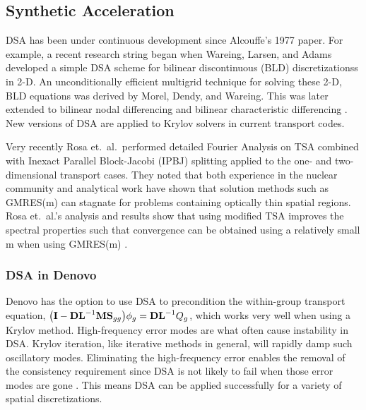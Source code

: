 \subsection{Synthetic Acceleration}
DSA has been under continuous development since Alcouffe's 1977 paper. For example, a recent research string began when Wareing, Larsen, and Adams developed a simple DSA scheme for bilinear discontinuous (BLD) discretizationss in 2-D. An unconditionally efficient multigrid technique for solving these 2-D, BLD equations was derived by Morel, Dendy, and Wareing. This was later extended to bilinear nodal differencing and bilinear characteristic differencing \cite{Adams2002}. New versions of DSA are applied to Krylov solvers in current transport codes.

Very recently Rosa et.\ al.\ performed detailed Fourier Analysis on TSA combined with Inexact Parallel Block-Jacobi (IPBJ) splitting applied to the one- and two-dimensional transport cases. They noted that both experience in the nuclear community and analytical work have shown that solution methods such as GMRES(m) can stagnate for problems containing optically thin spatial regions. Rosa et.\ al.'s analysis and results show that using modified TSA improves the spectral properties such that convergence can be obtained using a relatively small m when using GMRES(m) \cite{Rosa2010}.

\subsubsection{DSA in Denovo}
Denovo has the option to use DSA to precondition the within-group transport equation, $\bigl(\mathbf{I} - \mathbf{DL}^{-1}\mathbf{MS}_{gg}\bigr) \phi_{g} = \mathbf{DL}^{-1}Q_{g}$, which works very well when using a Krylov method. High-frequency error modes are what often cause instability in DSA. Krylov iteration, like iterative methods in general, will rapidly damp such oscillatory modes. Eliminating the high-frequency error enables the removal of the consistency requirement since DSA is not likely to fail when those error modes are gone \cite{Evans2009d}. This means DSA can be applied successfully for a variety of spatial discretizations. 


